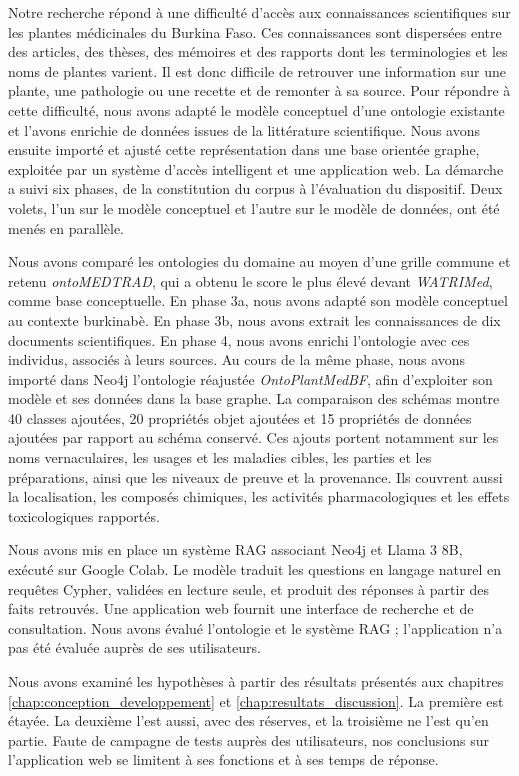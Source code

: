 Notre recherche répond à une difficulté d'accès aux connaissances scientifiques sur les plantes médicinales du Burkina Faso. Ces connaissances sont dispersées entre des articles, des thèses, des mémoires et des rapports dont les terminologies et les noms de plantes varient. Il est donc difficile de retrouver une information sur une plante, une pathologie ou une recette et de remonter à sa source. Pour répondre à cette difficulté, nous avons adapté le modèle conceptuel d'une ontologie existante et l'avons enrichie de données issues de la littérature scientifique. Nous avons ensuite importé et ajusté cette représentation dans une base orientée graphe, exploitée par un système d'accès intelligent et une application web. La démarche a suivi six phases, de la constitution du corpus à l'évaluation du dispositif. Deux volets, l'un sur le modèle conceptuel et l'autre sur le modèle de données, ont été menés en parallèle.

Nous avons comparé les ontologies du domaine au moyen d'une grille commune et retenu \textit{ontoMEDTRAD}, qui a obtenu le score le plus élevé devant \textit{WATRIMed}, comme base conceptuelle. En phase 3a, nous avons adapté son modèle conceptuel au contexte burkinabè. En phase 3b, nous avons extrait les connaissances de dix documents scientifiques. En phase 4, nous avons enrichi l'ontologie avec ces individus, associés à leurs sources. Au cours de la même phase, nous avons importé dans Neo4j l'ontologie réajustée \textit{OntoPlantMedBF}, afin d'exploiter son modèle et ses données dans la base graphe. La comparaison des schémas montre 40 classes ajoutées, 20 propriétés objet ajoutées et 15 propriétés de données ajoutées par rapport au schéma conservé. Ces ajouts portent notamment sur les noms vernaculaires, les usages et les maladies cibles, les parties et les préparations, ainsi que les niveaux de preuve et la provenance. Ils couvrent aussi la localisation, les composés chimiques, les activités pharmacologiques et les effets toxicologiques rapportés.

Nous avons mis en place un système RAG associant Neo4j et Llama 3 8B, exécuté sur Google Colab. Le modèle traduit les questions en langage naturel en requêtes Cypher, validées en lecture seule, et produit des réponses à partir des faits retrouvés. Une application web fournit une interface de recherche et de consultation. Nous avons évalué l'ontologie et le système RAG ; l'application n'a pas été évaluée auprès de ses utilisateurs.

Nous avons examiné les hypothèses à partir des résultats présentés aux chapitres \ref{chap:conception_developpement} et \ref{chap:resultats_discussion}. La première est étayée. La deuxième l'est aussi, avec des réserves, et la troisième ne l'est qu'en partie. Faute de campagne de tests auprès des utilisateurs, nos conclusions sur l'application web se limitent à ses fonctions et à ses temps de réponse.

